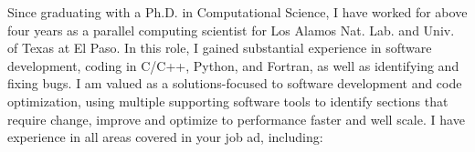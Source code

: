 \documentclass[10pt]{article}
\begin{document}
Since graduating with a Ph.D. in Computational Science, I have worked for above four years as a parallel computing scientist for Los Alamos Nat. Lab. and Univ. of Texas at El Paso. In this role, I gained substantial experience in software development, coding in C/C++, Python, and Fortran, as well as identifying and fixing bugs. I am valued as a solutions-focused to software development and code optimization, using multiple supporting software tools to identify sections that require change, improve and optimize to performance faster and well scale.   I have experience in all areas covered in your job ad, including:
\end{document}
